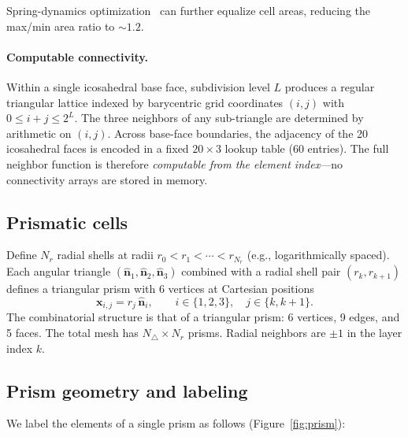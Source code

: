 \documentclass[11pt,a4paper]{article}
\begin{document}
Spring-dynamics optimization~\cite{Tomita2002} can further equalize cell areas,
reducing the max/min area ratio to $\sim 1.2$.

\paragraph{Computable connectivity.}
Within a single icosahedral base face, subdivision level $L$ produces a
regular triangular lattice indexed by barycentric grid coordinates $(i, j)$
with $0 \le i + j \le 2^L$. The three neighbors of any sub-triangle are
determined by arithmetic on $(i, j)$. Across base-face boundaries, the
adjacency of the 20 icosahedral faces is encoded in a fixed $20 \times 3$
lookup table (60 entries). The full neighbor function is therefore
\emph{computable from the element index}---no connectivity arrays are stored
in memory.

\subsection{Prismatic cells}

Define $N_r$ radial shells at radii $r_0 < r_1 < \cdots < r_{N_r}$ (e.g.,
logarithmically spaced). Each angular triangle
$(\hat{\bm{n}}_1, \hat{\bm{n}}_2, \hat{\bm{n}}_3)$ combined with a radial
shell pair $(r_k, r_{k+1})$ defines a triangular prism with 6 vertices at
Cartesian positions
\begin{equation}
  \bm{x}_{i,j} = r_j \, \hat{\bm{n}}_i, \qquad
  i \in \{1,2,3\}, \quad j \in \{k, k+1\}.
\end{equation}
The combinatorial structure is that of a triangular prism: 6 vertices,
9 edges, and 5 faces. The total mesh has $N_\triangle \times N_r$ prisms.
Radial neighbors are $\pm 1$ in the layer index $k$.

\subsection{Prism geometry and labeling}
\label{sec:labeling}

We label the elements of a single prism as follows
(Figure~\ref{fig:prism}):
\end{document}

